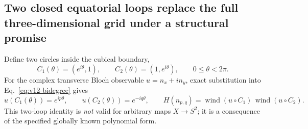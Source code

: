 \documentclass[aps,prd,onecolumn,notitlepage,11pt,superscriptaddress,longbibliography]{revtex4-2}
\begin{document}
\subsection{Two closed equatorial loops replace the full three-dimensional grid under a structural promise}\label{subsec:v12-two-loops}
Define two circles inside the cubical boundary,
\begin{equation}\label{eq:v12-loops}
 C_1(\theta)=(e^{i\theta},1),\qquad C_2(\theta)=(1,e^{i\theta}),\qquad0\le\theta<2\pi.
\end{equation}
For the complex transverse Bloch observable $u=n_x+i n_y$, exact substitution into Eq.~\eqref{eq:v12-bidegree} gives
\begin{equation}\label{eq:v12-loop-phases}
 u(C_1(\theta))=e^{ip\theta},\qquad u(C_2(\theta))=e^{-iq\theta},\qquad
 \boxed{H(n_{p,q})=\operatorname{wind}(u\circ C_1)\,\operatorname{wind}(u\circ C_2).}
\end{equation}
This two-loop identity is \emph{not} valid for arbitrary maps $X\to S^2$; it is a consequence of the specified globally known polynomial form.
\end{document}
